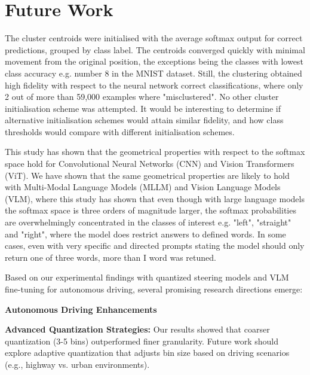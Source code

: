 
\chapter{Future Work}
\label{conclusion_future_work}

The cluster centroids were initialised with the average softmax output for correct predictions, grouped by class label. The centroids converged quickly with minimal movement from the original position, the exceptions being the classes with lowest class accuracy e.g. number 8 in the MNIST dataset. Still, the clustering obtained high fidelity with respect to the neural network correct classifications, where only 2 out of more than 59,000 examples where "misclustered". No other cluster initialisation scheme was attempted. It would be interesting to determine if alternative initialisation schemes would attain similar fidelity, and how class thresholds would compare with different initialisation schemes.


This study has shown that the geometrical properties with respect to the softmax space hold for Convolutional Neural Networks (CNN) and Vision Transformers (ViT). We have shown that the same geometrical properties are likely to hold with Multi-Modal Language Models (MLLM) and Vision Language Models (VLM), where this study has shown that even though with large language models the softmax space is three orders of magnitude larger, the softmax probabilities are overwhelmingly concentrated in the classes of interest e.g. "left", "straight" and "right", where the model does restrict answers to defined words. In some cases, even with very  specific and directed prompts stating the model should only return one of three words, more than I word was retuned.

Based on our experimental findings with quantized steering models and VLM fine-tuning for autonomous driving, several promising research directions emerge:

\textbf{Autonomous Driving Enhancements}

\textbf{Advanced Quantization Strategies:} Our results showed that coarser quantization (3-5 bins) outperformed finer granularity. Future work should explore adaptive quantization that adjusts bin size based on driving scenarios (e.g., highway vs. urban environments).

